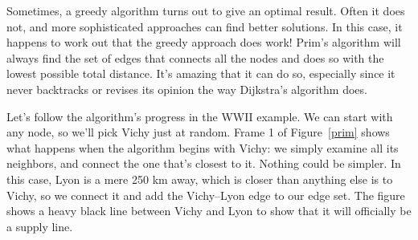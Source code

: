 Sometimes, a greedy algorithm turns out to give an optimal result. Often it
does not, and more sophisticated approaches can find better solutions.  In
this case, it happens to work out that the greedy approach does work!
Prim's algorithm will always find the set of edges that connects all the
nodes and does so with the lowest possible total distance. It's amazing
that it can do so, especially since it never backtracks or revises its
opinion the way Dijkstra's algorithm does.

Let's follow the algorithm's progress in the WWII example. We can start
with any node, so we'll pick Vichy just at random. Frame 1 of
Figure~\ref{prim} shows what happens when the algorithm begins with Vichy:
we simply examine all its neighbors, and connect the one that's closest to
it. Nothing could be simpler. In this case, Lyon is a mere 250 km away,
which is closer than anything else is to Vichy, so we connect it and add
the Vichy--Lyon edge to our edge set. The figure shows a heavy black line
between Vichy and Lyon to show that it will officially be a supply line.

